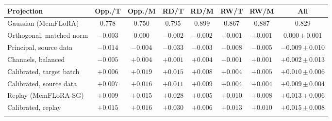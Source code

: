 \begin{tabular}{@{}l cccccc c@{}}
\toprule
Projection & Opp./T & Opp./M & RD/T & RD/M & RW/T & RW/M & All \\
\midrule
Gaussian (MemFLoRA) & 0.778 & 0.750 & 0.795 & 0.899 & 0.867 & 0.887 & 0.829 \\
\midrule
Orthogonal, matched norm & $-0.003$ & $0.000$ & $-0.002$ & $-0.002$ & $-0.001$ & $+0.001$ & $0.000$\,{\scriptsize$\pm$\,0.001} \\
Principal, source data & $-0.014$ & $-0.004$ & $-0.033$ & $-0.003$ & $-0.008$ & $-0.005$ & $-0.009$\,{\scriptsize$\pm$\,0.010} \\
Channels, balanced & $-0.005$ & $+0.004$ & $+0.001$ & $+0.004$ & $-0.001$ & $+0.001$ & $+0.002$\,{\scriptsize$\pm$\,0.013} \\
Calibrated, target batch & $+0.006$ & $+0.019$ & $+0.015$ & $+0.008$ & $+0.004$ & $+0.005$ & $+0.010$\,{\scriptsize$\pm$\,0.006} \\
Calibrated, source data & $+0.007$ & $+0.016$ & $+0.011$ & $+0.009$ & $+0.004$ & $+0.004$ & $+0.009$\,{\scriptsize$\pm$\,0.004} \\
Replay (MemFLoRA-SG) & $+0.009$ & $+0.015$ & $+0.028$ & $+0.005$ & $+0.010$ & $+0.008$ & $+0.013$\,{\scriptsize$\pm$\,0.006} \\
Calibrated, replay & $+0.015$ & $+0.016$ & $+0.030$ & $+0.006$ & $+0.013$ & $+0.010$ & $+0.015$\,{\scriptsize$\pm$\,0.008} \\
\botrule
\end{tabular}
